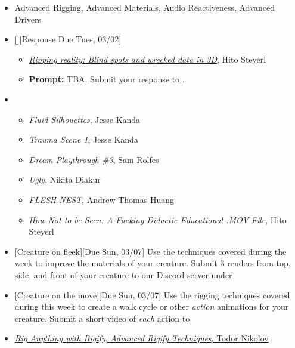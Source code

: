 \def\dMon{Mon, 03/01}
\def\dTues{Tues, 03/02}
\def\dWed{Wed, 03/03}
\def\dThur{Thur, 03/04}
\def\dFri{Fri, 03/05}
\def\dSat{Sat, 03/06}
\def\dSun{Sun, 03/07}
\placeDate

\begin{itemize}[noitemsep,topsep=0pt,leftmargin=*]
    \item {} Advanced Rigging, Advanced Materials, Audio Reactiveness, Advanced Drivers
    \item {}[][Response Due \dTues]
          \begin{itemize}
              \item \emph{\href{http://eipcp.net/e/projects/heterolingual/files/hitosteyerl/}{Ripping reality: Blind spots and wrecked data in 3D}}, Hito Steyerl
              \item \textbf{Prompt:} TBA. Submit your response to \discordR.
          \end{itemize}
    \item {}
          \begin{itemize}
              \item \emph{Fluid Silhouettes}, Jesse Kanda
              \item \emph{Trauma Scene 1}, Jesse Kanda
              \item \emph{Dream Playthrough \#3}, Sam Rolfes
              \item \emph{Ugly}, Nikita Diakur
              \item \emph{FLESH NEST}, Andrew Thomas Huang
              \item \emph{How Not to be Seen: A Fucking Didactic Educational .MOV File}, Hito Steyerl
          \end{itemize}
    \item {}[Creature on fleek][Due \dSun]
          \newline Use the techniques covered during the week to improve the materials of your creature. Submit 3 renders from top, side, and front of your creature to our Discord server under \discordC
    \item {}[Creature on the move][Due \dSun]
          \newline Use the rigging techniques covered during this week to create a walk cycle or other \emph{action} animations for your creature. Submit a short video of \emph{each} action to \discordC
    \item {} \href{https://www.youtube.com/playlist?list=PLdcL5aF8ZcJv68SSdwxip33M7snakl6Dx}{\emph{Rig Anything with Rigify}, \emph{\href{https://www.youtube.com/playlist?list=PLdcL5aF8ZcJttvb-rgvyA1NkRi77zVP-J}{Advanced Rigify Techniques}}, Todor Nikolov }
\end{itemize}